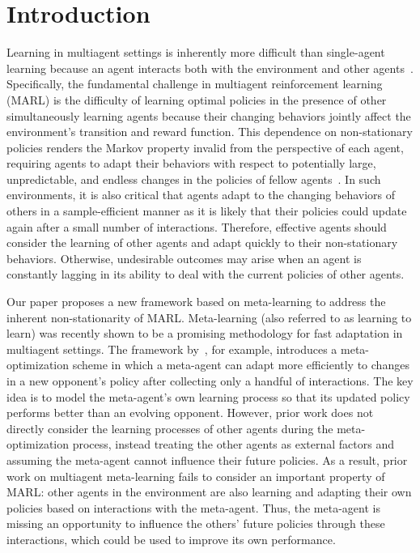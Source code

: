 \section{Introduction}\label{sec:introduction}

Learning in multiagent settings is inherently more difficult than single-agent learning because an agent interacts both with the environment and other agents~\citep{Busoniu2010}.
Specifically, the fundamental challenge in multiagent reinforcement learning (MARL) is the difficulty of learning optimal policies 
in the presence of other simultaneously learning agents because their changing behaviors jointly affect the environment's transition and reward function. 
This dependence on non-stationary policies renders the Markov property invalid from the perspective of each agent, requiring agents to adapt their behaviors with respect to potentially large, unpredictable, and endless changes in the policies of fellow agents~\citep{papoudakis19nonstationarity}.
In such environments, it is also critical that agents adapt to the changing behaviors of others in a sample-efficient manner as it is likely that their policies could update again after a small number of interactions.
Therefore, effective agents should consider the learning of other agents and adapt quickly to their non-stationary behaviors. 
Otherwise, undesirable outcomes may arise when an agent is constantly lagging in its ability to deal with the current policies of other agents. %

Our paper proposes a new framework based on meta-learning to address the inherent non-stationarity of MARL.
Meta-learning (also referred to as learning to learn) was recently shown to be a promising methodology for fast adaptation in multiagent settings. 
The framework by~\citet{alshedivat2018continuous}, for example, introduces a meta-optimization scheme in which a meta-agent can adapt more efficiently to changes in a new opponent's policy after collecting only a handful of interactions.
The key idea is to model the meta-agent's own learning process so that its updated policy performs better than an evolving opponent.
However, prior work does not directly consider the learning processes of other agents during the meta-optimization process, instead treating the other agents as external factors and assuming the meta-agent cannot influence their future policies.
As a result, prior work on multiagent meta-learning fails to consider an important property of MARL: other agents in the environment are also learning and adapting their own policies based on interactions with the meta-agent. 
Thus, the meta-agent is missing an opportunity to influence the others' future policies through these interactions, which could be used to improve its own performance.
  
